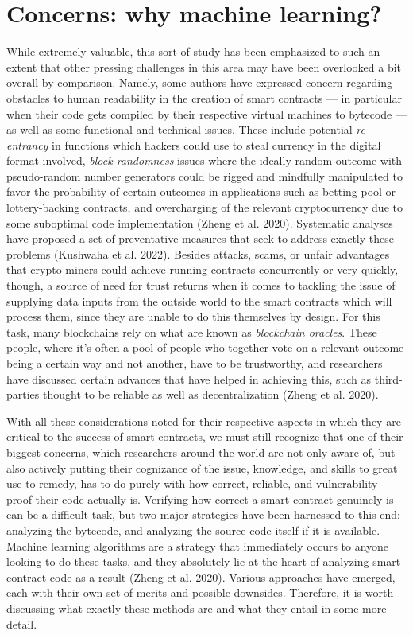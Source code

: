 \documentclass[
  11pt,
]{article}
\begin{document}
\hypertarget{concerns-why-machine-learning}{%
\section{Concerns: why machine
learning?}\label{concerns-why-machine-learning}}

While extremely valuable, this sort of study has been emphasized to such
an extent that other pressing challenges in this area may have been
overlooked a bit overall by comparison. Namely, some authors have
expressed concern regarding obstacles to human readability in the
creation of smart contracts --- in particular when their code gets
compiled by their respective virtual machines to bytecode --- as well as
some functional and technical issues. These include potential
\emph{re-entrancy} in functions which hackers could use to steal
currency in the digital format involved, \emph{block randomness} issues
where the ideally random outcome with pseudo-random number generators
could be rigged and mindfully manipulated to favor the probability of
certain outcomes in applications such as betting pool or lottery-backing
contracts, and overcharging of the relevant cryptocurrency due to some
suboptimal code implementation (Zheng et al. 2020). Systematic analyses
have proposed a set of preventative measures that seek to address
exactly these problems (Kushwaha et al. 2022). Besides attacks, scams,
or unfair advantages that crypto miners could achieve running contracts
concurrently or very quickly, though, a source of need for trust returns
when it comes to tackling the issue of supplying data inputs from the
outside world to the smart contracts which will process them, since they
are unable to do this themselves by design. For this task, many
blockchains rely on what are known as \emph{blockchain oracles}. These
people, where it's often a pool of people who together vote on a
relevant outcome being a certain way and not another, have to be
trustworthy, and researchers have discussed certain advances that have
helped in achieving this, such as third-parties thought to be reliable
as well as decentralization (Zheng et al. 2020).

With all these considerations noted for their respective aspects in
which they are critical to the success of smart contracts, we must still
recognize that one of their biggest concerns, which researchers around
the world are not only aware of, but also actively putting their
cognizance of the issue, knowledge, and skills to great use to remedy,
has to do purely with how correct, reliable, and vulnerability-proof
their code actually is. Verifying how correct a smart contract genuinely
is can be a difficult task, but two major strategies have been harnessed
to this end: analyzing the bytecode, and analyzing the source code
itself if it is available. Machine learning algorithms are a strategy
that immediately occurs to anyone looking to do these tasks, and they
absolutely lie at the heart of analyzing smart contract code as a result
(Zheng et al. 2020). Various approaches have emerged, each with their
own set of merits and possible downsides. Therefore, it is worth
discussing what exactly these methods are and what they entail in some
more detail.
\end{document}

